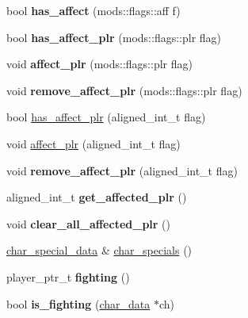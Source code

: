 \begin{DoxyCompactItemize}
bool {\bfseries has\+\_\+affect} (mods\+::flags\+::aff f)
\item 
\mbox{\label{classmods_1_1player_a19f76082128ca4e04a5b3e15be08efed}} 
bool {\bfseries has\+\_\+affect\+\_\+plr} (mods\+::flags\+::plr flag)
\item 
\mbox{\label{classmods_1_1player_afb04417525df1af56cbbf21c092d2d84}} 
void {\bfseries affect\+\_\+plr} (mods\+::flags\+::plr flag)
\item 
\mbox{\label{classmods_1_1player_af7805037a2d455dee15ad5f7ae30a3ee}} 
void {\bfseries remove\+\_\+affect\+\_\+plr} (mods\+::flags\+::plr flag)
\item 
bool \hyperlink{classmods_1_1player_ae07901c25cbe93b8c259720f1662e5d3}{has\+\_\+affect\+\_\+plr} (aligned\+\_\+int\+\_\+t flag)
\item 
void \hyperlink{classmods_1_1player_acd374d4b3b772201c0ec8611fbbc9c4a}{affect\+\_\+plr} (aligned\+\_\+int\+\_\+t flag)
\item 
\mbox{\label{classmods_1_1player_a13bddf9d9e26c4a1c486f20e3b863eb3}} 
void {\bfseries remove\+\_\+affect\+\_\+plr} (aligned\+\_\+int\+\_\+t flag)
\item 
\mbox{\label{classmods_1_1player_a0431c2804168d8641764c13ca202b82b}} 
aligned\+\_\+int\+\_\+t {\bfseries get\+\_\+affected\+\_\+plr} ()
\item 
\mbox{\label{classmods_1_1player_ac969608261f9794513b2719f7804db59}} 
void {\bfseries clear\+\_\+all\+\_\+affected\+\_\+plr} ()
\item 
\hyperlink{structchar__special__data}{char\+\_\+special\+\_\+data} \& \hyperlink{classmods_1_1player_af85ed0368fd327f3747b4d1e6572cccc}{char\+\_\+specials} ()
\item 
\mbox{\label{classmods_1_1player_aed046739ae34b5b39fdc315267809265}} 
player\+\_\+ptr\+\_\+t {\bfseries fighting} ()
\item 
\mbox{\label{classmods_1_1player_a5390344e407af0c1b9f1d3cff0a42eca}} 
bool {\bfseries is\+\_\+fighting} (\hyperlink{structchar__data}{char\+\_\+data} $\ast$ch)

\end{DoxyCompactItemize}
